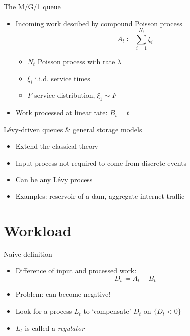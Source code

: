 \documentclass{beamer}
\begin{document}
\begin{frame}{The M/G/1 queue}
  \begin{itemize}
    \item Incoming work descibed by compound Poisson process
          \begin{equation}
            A_t \coloneqq \sum_{i = 1}^{N_t} \xi_i
          \end{equation}
          \begin{itemize}
            \item $N_t$ Poisson process with rate $\lambda$
            \item $\xi_i$ i.i.d. service times
            \item $F$ service distribution, $\xi_1 \sim F$
          \end{itemize}
    \item Work processed at linear rate: $B_t = t$
  \end{itemize}
\end{frame}

\begin{frame}{Lévy-driven queues \& general storage models}
  \begin{itemize}
    \item Extend the classical theory
    \item Input process not required to come from discrete events
    \item Can be any L\'evy process
    \item Examples: reservoir of a dam, aggregate internet traffic
  \end{itemize}
\end{frame}

\section{Workload}

\begin{frame}{Naive definition}
  \begin{itemize}
    \item Difference of input and processed work:
          \begin{equation}
            D_t \coloneqq A_t - B_t
          \end{equation}
    \item Problem: can become negative!
    \item Look for a process $L_t$ to `compensate' $D_t$ on $\{ D_t < 0\}$
    \item $L_t$ is called a \emph{regulator}
  \end{itemize}
\end{frame}
\end{document}

